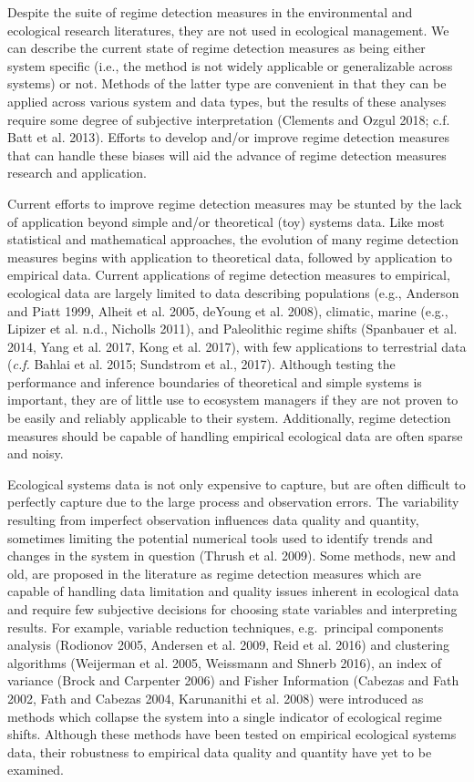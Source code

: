 \documentclass[12pt,twoside,openany]{reedthesis}
\begin{document}
Despite the suite of regime detection measures in the environmental and
ecological research literatures, they are not used in ecological
management. We can describe the current state of regime detection
measures as being either system specific (i.e., the method is not widely
applicable or generalizable across systems) or not. Methods of the
latter type are convenient in that they can be applied across various
system and data types, but the results of these analyses require some
degree of subjective interpretation (Clements and Ozgul 2018; c.f. Batt
et al. 2013). Efforts to develop and/or improve regime detection
measures that can handle these biases will aid the advance of regime
detection measures research and application.

Current efforts to improve regime detection measures may be stunted by
the lack of application beyond simple and/or theoretical (toy) systems
data. Like most statistical and mathematical approaches, the evolution
of many regime detection measures begins with application to theoretical
data, followed by application to empirical data. Current applications of
regime detection measures to empirical, ecological data are largely
limited to data describing populations (e.g., Anderson and Piatt 1999,
Alheit et al. 2005, deYoung et al. 2008), climatic, marine (e.g.,
Lipizer et al. n.d., Nicholls 2011), and Paleolithic regime shifts
(Spanbauer et al. 2014, Yang et al. 2017, Kong et al. 2017), with few
applications to terrestrial data (\emph{c.f.} Bahlai et al. 2015;
Sundstrom et al., 2017). Although testing the performance and inference
boundaries of theoretical and simple systems is important, they are of
little use to ecosystem managers if they are not proven to be easily and
reliably applicable to their system. Additionally, regime detection
measures should be capable of handling empirical ecological data are
often sparse and noisy.

Ecological systems data is not only expensive to capture, but are often
difficult to perfectly capture due to the large process and observation
errors. The variability resulting from imperfect observation influences
data quality and quantity, sometimes limiting the potential numerical
tools used to identify trends and changes in the system in question
(Thrush et al. 2009). Some methods, new and old, are proposed in the
literature as regime detection measures which are capable of handling
data limitation and quality issues inherent in ecological data and
require few subjective decisions for choosing state variables and
interpreting results. For example, variable reduction techniques,
e.g.~principal components analysis (Rodionov 2005, Andersen et al. 2009,
Reid et al. 2016) and clustering algorithms (Weijerman et al. 2005,
Weissmann and Shnerb 2016), an index of variance (Brock and Carpenter
2006) and Fisher Information (Cabezas and Fath 2002, Fath and Cabezas
2004, Karunanithi et al. 2008) were introduced as methods which collapse
the system into a single indicator of ecological regime shifts. Although
these methods have been tested on empirical ecological systems data,
their robustness to empirical data quality and quantity have yet to be
examined.
\end{document}
